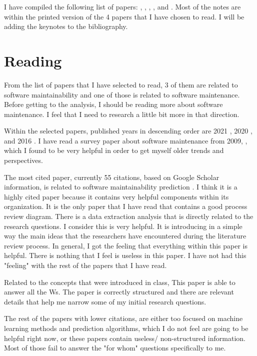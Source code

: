 \documentclass[article]{IEEEtran}
\begin{document}
I have compiled the following list of papers:
\cite{alsolai2020systematic}, \cite{khezami2021systematic}, \cite{malhotra2016software}, \cite{malhotra2020systematic}, \cite{tian2021impact} and \cite{riaz2009systematic}.
Most of the notes are within the printed version of the 4 papers that I have chosen to read. I will be adding the keynotes to the bibliography.

\section{Reading}
From the list of papers that I have selected to read, 3 of them are related to software maintainability and one of those is related to software maintenance. Before getting to the analysis, I should be reading more about software maintenance. I feel that I need to research a little bit more in that direction.

Within the selected papers, published years in descending order are 2021 \cite{khezami2021systematic}, 2020 \cite{malhotra2020systematic}, \cite{alsolai2020systematic} and 2016 \cite{malhotra2016software}. I have read a survey paper about software maintenance from 2009, \cite{riaz2009systematic}, which I found to be very helpful in order to get myself older trends and perspectives.

The most cited paper, currently 55 citations, based on Google Scholar information, is related to software maintainability prediction \cite{alsolai2020systematic}. I think it is a highly cited paper because it contains very helpful components within its organization. It is the only paper that I have read that contains a good process review diagram. There is a data extraction analysis that is directly related to the research questions. I consider this is very helpful. It is introducing in a simple way the main ideas that the researchers have encountered during the literature review process. In general, I got the feeling that everything within this paper is helpful. There is nothing that I feel is useless in this paper. I have not had this "feeling" with the rest of the papers that I have read.

Related to the concepts that were introduced in class, This paper is able to answer all the Ws. The paper is correctly structured and there are relevant details that help me narrow some of my initial research questions.

The rest of the papers with lower citations, are either too focused on machine learning methods and prediction algorithms, which I do not feel are going to be helpful right now, or these papers contain useless/ non-structured information. Most of those fail to answer the "for whom" questions specifically to me.
\end{document}
